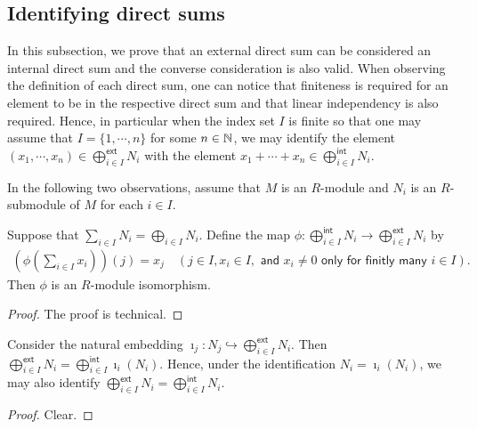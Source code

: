 
\subsection{Identifying direct sums}

In this subsection, we prove that an external direct sum can be considered an internal direct sum and the converse consideration is also valid.
When observing the definition of each direct sum, one can notice that finiteness is required for an element to be in the respective direct sum and that linear independency is also required.
Hence, in particular when the index set $I$ is finite so that one may assume that $I=\{1, \cdots, n\}$ for some $n\in{\mathbb{N}}$, we may identify the element $(x_1, \cdots, x_n)\in\bigoplus_{i\in I}^\textsf{ext} N_i$ with the element $x_1+\cdots+x_n\in\bigoplus_{i\in I}^\textsf{int} N_i$.

In the following two observations, assume that $M$ is an $R$-module and $N_i$ is an $R$-submodule of $M$ for each $i\in I$.

\begin{obs}
    Suppose that $\sum_{i\in I}N_i=\bigoplus_{i\in I}N_i$.
    Define the map $\phi: \bigoplus_{i\in I}^\textsf{int} N_i \rightarrow \bigoplus_{i\in I}^\textsf{ext} N_i$ by
    \begin{align*}
        \left(\phi\left(\sum_{i\in I} x_i\right)\right)(j)=x_j\quad(j\in I, x_i\in I,\textsf{ and }x_i\neq 0\textsf{ only for finitly many }i\in I).
    \end{align*}
    Then $\phi$ is an $R$-module isomorphism.
\end{obs}
\begin{proof}
    \color{brown}The proof is technical.\color{black}
\end{proof}

\begin{obs}
    Consider the natural embedding $\imath_j: N_j\hookrightarrow\bigoplus_{i\in I}^\textsf{ext} N_i$.
    Then $\bigoplus_{i\in I}^\textsf{ext} N_i=\bigoplus_{i\in I}^\textsf{int}\imath_i(N_i)$.
    Hence, under the identification $N_i=\imath_i(N_i)$, we may also identify $\bigoplus_{i\in I}^\textsf{ext} N_i=\bigoplus_{i\in I}^\textsf{int} N_i$.
\end{obs}
\begin{proof}
    \color{brown}Clear.\color{black}
\end{proof}